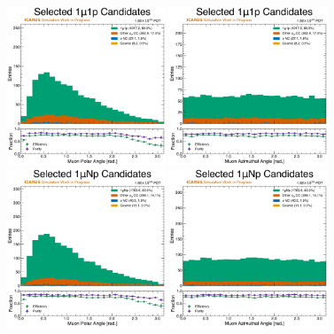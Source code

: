 \begin{figure}[!htb]
    \centering
    \includegraphics[width=0.42\textwidth]{figures/neutrino_selection/selected_hist1d_1mu1p_muon_polar_angle.pdf}
    \includegraphics[width=0.42\textwidth]{figures/neutrino_selection/selected_hist1d_1mu1p_muon_azimuthal_angle.pdf}
    \\
    \includegraphics[width=0.42\textwidth]{figures/neutrino_selection/selected_hist1d_1muNp_muon_polar_angle.pdf}
    \includegraphics[width=0.42\textwidth]{figures/neutrino_selection/selected_hist1d_1muNp_muon_azimuthal_angle.pdf}

\end{figure}
